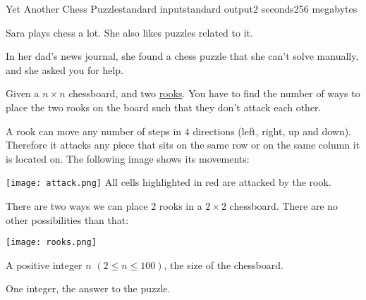 \begin{problem}{Yet Another Chess Puzzle}{standard input}{standard output}{2 seconds}{256 megabytes}

Sara plays chess a lot. She also likes puzzles related to it.

In her dad's news journal, she found a chess puzzle that she can't solve manually, and she asked you for help.

Given a $n \times n$ chessboard, and two \href{https://en.wikipedia.org/wiki/Rook_(chess)}{rooks}. You have to find the number of ways to place the two rooks on the board such that they don't attack each other.

A rook can move any number of steps in $4$ directions (left, right, up and down). Therefore it attacks any piece that sits on the same row or on the same column it is located on. The following image shows its movements:

   


\begin{center}
\texttt{[image: attack.png]}
\small{All cells highlighted in red are attacked by the rook.}
\end{center}

\Example

   

There are two ways we can place $2$ rooks in a $2 \times 2$ chessboard. There are no other possibilities than that:

\begin{center}
\texttt{[image: rooks.png]}
\end{center}


\InputFile
A positive integer $n$ $(2 \leq n \leq 100)$, the size of the chessboard.

\OutputFile
One integer, the answer to the puzzle.

\Examples

\begin{example}
%
%
\end{example}

\end{problem}

